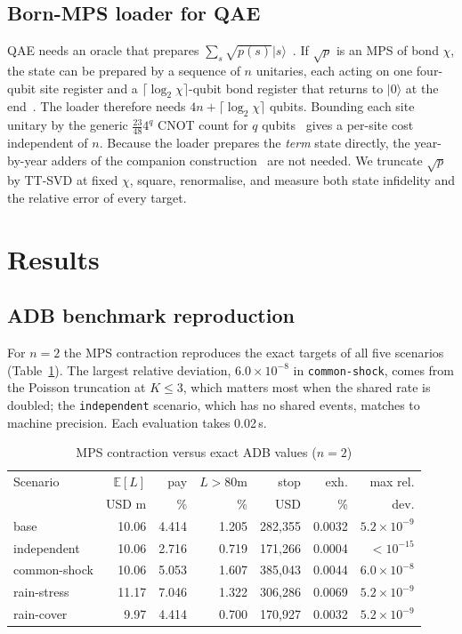 \documentclass[conference]{IEEEtran}
\newcommand{\Ex}{\mathbb{E}}
\begin{document}
\subsection{Born-MPS loader for QAE}\label{sec:bornmethod}
QAE needs an oracle that prepares $\sum_s\sqrt{p(s)}\lvert s\rangle$~\cite{brassard2002,montanaro2015}. If
$\sqrt{p}$ is an MPS of bond $\chi$, the state can be prepared by a sequence of $n$ unitaries, each acting on one
four-qubit site register and a $\lceil\log_2\chi\rceil$-qubit bond register that returns to $\lvert0\rangle$ at the end~\cite{schon2005}.
The loader therefore needs $4n+\lceil\log_2\chi\rceil$ qubits. Bounding each site unitary by the generic
$\tfrac{23}{48}4^{q}$ CNOT count for $q$ qubits~\cite{shende2006} gives a per-site cost independent of $n$. Because the
loader prepares the \emph{term} state directly, the year-by-year adders of the companion construction~\cite{paper1} are
not needed. We truncate $\sqrt{p}$ by TT-SVD at fixed $\chi$, square, renormalise, and measure both state infidelity
and the relative error of every target.

\section{Results}\label{sec:results}
\subsection{ADB benchmark reproduction}\label{sec:adb}
For $n=2$ the MPS contraction reproduces the exact targets of all five scenarios (Table~\ref{tab:adb}). The largest
relative deviation, $6.0\times10^{-8}$ in \texttt{common-shock}, comes from the Poisson truncation at $K\le3$, which
matters most when the shared rate is doubled; the \texttt{independent} scenario, which has no shared events, matches
to machine precision. Each evaluation takes 0.02\,s.

\begin{table}[t]
\caption{MPS contraction versus exact ADB values ($n=2$)}
\label{tab:adb}
\centering\footnotesize
\setlength{\tabcolsep}{2.2pt}
\begin{tabular}{lrrrrrr}
\toprule
Scenario & $\Ex[L]$ & pay & $L\!>\!80$m & stop & exh. & max rel.\\
 & USD m & \% & \% & USD & \% & dev.\\
\midrule
base & 10.06 & 4.414 & 1.205 & 282{,}355 & 0.0032 & $5.2\times10^{-9}$\\
independent & 10.06 & 2.716 & 0.719 & 171{,}266 & 0.0004 & $<10^{-15}$\\
common-shock & 10.06 & 5.053 & 1.607 & 385{,}043 & 0.0044 & $6.0\times10^{-8}$\\
rain-stress & 11.17 & 7.046 & 1.322 & 306{,}286 & 0.0069 & $5.2\times10^{-9}$\\
rain-cover & 9.97 & 4.414 & 0.700 & 170{,}927 & 0.0032 & $5.2\times10^{-9}$\\
\bottomrule
\end{tabular}
\end{table}
\end{document}

